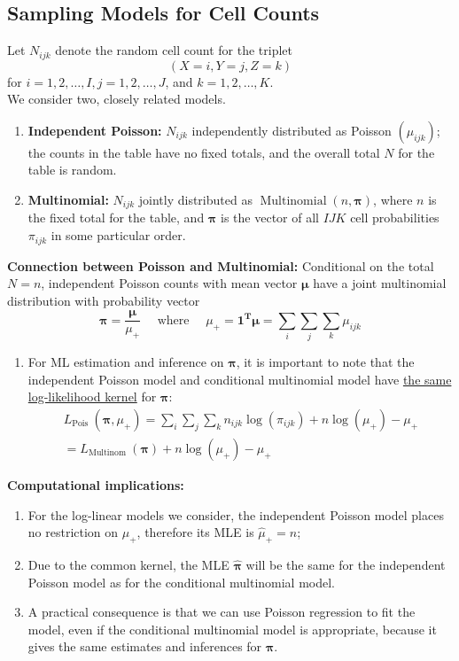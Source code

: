 \documentclass[11pt]{elegantbook}
\begin{document}
\subsection{Sampling Models for Cell Counts}
Let $N_{i j k}$ denote the random cell count for the triplet
$$
(X=i, Y=j, Z=k)
$$
for $i=1,2, \ldots, I, j=1,2, \ldots, J$, and $k=1,2, \ldots, K$.\\
We consider two, closely related models.
\begin{enumerate}[(1)]
    \item \textbf{Independent Poisson:} $N_{i j k}$ independently distributed as Poisson $\left(\mu_{i j k}\right)$; the counts in the table have no fixed totals, and the overall total $N$ for the table is random.
    \item \textbf{Multinomial:} $N_{i j k}$ jointly distributed as $\operatorname{Multinomial}(n, \boldsymbol{\pi})$, where $n$ is the fixed total for the table, and $\boldsymbol{\pi}$ is the vector of all $I J K$ cell probabilities $\pi_{i j k}$ in some particular order.
\end{enumerate}
\textbf{Connection between Poisson and Multinomial:} Conditional on the total $N=n$, independent Poisson counts with mean vector $\boldsymbol{\mu}$ have a joint multinomial distribution with probability vector
$$
\boldsymbol{\pi}=\frac{\boldsymbol{\mu}}{\mu_{+}} \quad \text { where } \quad \mu_{+}=\mathbf{1}^{\boldsymbol{T}} \boldsymbol{\mu}=\sum_i \sum_j \sum_k \mu_{i j k}
$$
\begin{enumerate}[$\bullet$]
    \item For ML estimation and inference on $\boldsymbol{\pi}$, it is important to note that the independent Poisson model and conditional multinomial model have \underline{the same log-likelihood kernel} for $\boldsymbol{\pi}$:
    $$
    \begin{array}{r}
    L_{\text {Pois }}\left(\boldsymbol{\pi}, \mu_{+}\right)=\sum_i \sum_j \sum_k n_{i j k} \log \left(\pi_{i j k}\right)+n \log \left(\mu_{+}\right)-\mu_{+} \\
    =L_{\text {Multinom }}(\boldsymbol{\pi})+n \log \left(\mu_{+}\right)-\mu_{+}
    \end{array}
    $$
\end{enumerate}
\textbf{Computational implications:}
\begin{enumerate}[$\bullet$]
    \item For the log-linear models we consider, the independent Poisson model places no restriction on $\mu_+$, therefore its MLE is $\hat{\mu}_+ = n$;
    \item Due to the common kernel, the MLE $\hat{\boldsymbol{\pi}}$ will be the same for the independent Poisson model as for the conditional multinomial model.
    \item A practical consequence is that we can use Poisson regression to fit the model, even if the conditional multinomial model is appropriate, because it gives the same estimates and inferences for $\boldsymbol{\pi}$.
\end{enumerate}
\end{document}
